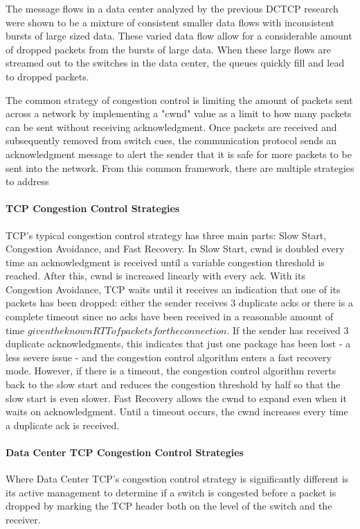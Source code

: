 \documentclass[%
 reprint,
amsmath,amssymb,
aps,
]{revtex4-2}
\begin{document}
The message flows in a data center analyzed by the previous DCTCP research were shown to be a mixture of consistent smaller data flows with inconsistent bursts of large sized data. These varied data flow allow for a considerable amount of dropped packets from the bursts of large data. When these large flows are streamed out to the switches in the data center, the queues quickly fill and lead to dropped packets.

The common strategy of congestion control is limiting the amount of packets sent across a network by implementing a "cwnd" value as a limit to how many packets can be sent without receiving acknowledgment. Once packets are received and subsequently removed from switch cues, the communication protocol sends an acknowledgment message to alert the sender that it is safe for more packets to be sent into the network. From this common framework, there are multiple strategies to address  

\paragraph{TCP Congestion Control Strategies}
TCP's typical congestion control strategy has three main parts: Slow Start, Congestion Avoidance, and Fast Recovery. 
In Slow Start, cwnd is doubled every time an acknowledgment is received until a variable congestion threshold is reached. After this, cwnd is increased linearly with every ack. 
With its Congestion Avoidance, TCP waits until it receives an indication that one of its packets has been dropped: either the sender receives 3 duplicate acks or there is a complete timeout since no acks have been received in a reasonable amount of time \(given the known RTT of packets for the connection\). If the sender has received 3 duplicate acknowledgments, this indicates that just one package has been lost - a less severe issue - and the congestion control algorithm enters a fast recovery mode. However, if there is a timeout, the congestion control algorithm reverts back to the slow start and reduces the congestion threshold by half so that the slow start is even slower.
Fast Recovery allows the cwnd to expand even when it waits on acknowledgment. Until a timeout occurs, the cwnd increases every time a duplicate ack is received.

\paragraph{Data Center TCP Congestion Control Strategies}
Where Data Center TCP's congestion control strategy is significantly different is its active management to determine if a switch is congested before a packet is dropped by marking the TCP header both on the level of the switch and the receiver.
\end{document}
